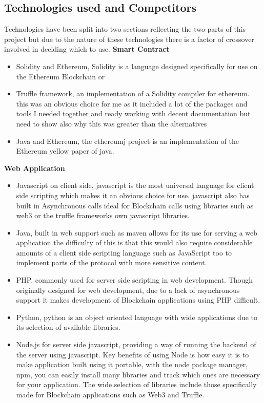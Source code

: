 \documentclass{entcs}
\begin{document}
\subsection{Technologies used and Competitors}
Technologies have been split into two sections reflecting the two parts of this project but due to the nature of these technologies there is a factor of crossover involved in deciding which to use.
\textbf{Smart Contract}
\begin{itemize}
    \item Solidity and Ethereum, Solidity is a language designed specifically for use on the Ethereum Blockchain or 
    \item Truffle framework, an implementation of a Solidity compiler for ethereum. this was an obvious choice for me as it included a lot of the packages and tools I needed together and ready working with decent documentation but need to show also why this was greater than the alternatives
    \item Java and Ethereum, the ethereumj project is an implementation of the Ethereum yellow paper of java. 
\end{itemize}

\textbf{Web Application}
\begin{itemize}
    \item Javascript on client side, javascript is the most universal language for client side scripting which makes it an obvious choice for use. javascript also has built in Asynchronous calls ideal for Blockchain calls using libraries such as web3 or the truffle frameworks own javascript libraries. 
    \item Java, built in web support such as maven allows for its use for serving a web application the difficulty of this is that this would also require considerable amounts of a client side scripting language such as JavaScript too to implement parts of the protocol with more sensitive content. 
    \item PHP, commonly used for server side scripting in web development. Though originally designed for web development, due to a lack of asynchronous support it makes development of Blockchain applications using PHP difficult.
    \item Python, python is an object oriented language with wide applications due to its selection of available libraries.
    \item Node.js for server side javascript, providing a way of running the backend of the server using javascript. Key benefits of using Node is how easy it is to make application built using it portable, with the node package manager, npm, you can easily install many libraries and track which ones are necessary for your application. The wide selection of libraries include those specifically made for Blockchain applications such as Web3 and Truffle.
\end{itemize}
\end{document}
